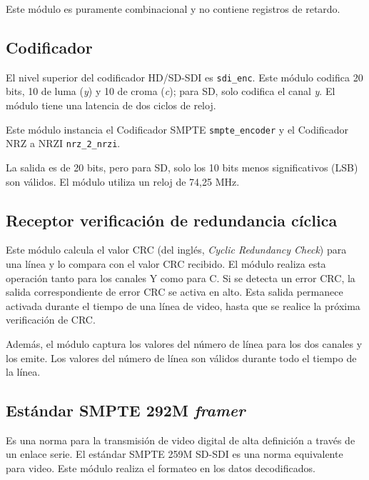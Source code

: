 Este módulo es puramente combinacional y no contiene registros de retardo.

\subsection{Codificador}

  El nivel superior del codificador HD/SD-SDI es \texttt{sdi\_enc}. Este módulo
  codifica 20 bits, 10 de luma (\textit{y}) y 10 de croma (\textit{c}); para SD,
  solo codifica el canal \textit{y}. El módulo tiene una latencia de dos ciclos
  de reloj.

  Este módulo instancia el Codificador SMPTE \texttt{smpte\_encoder} y el
  Codificador NRZ a NRZI \texttt{nrz\_2\_nrzi}.

  La salida es de 20 bits, pero para SD, solo los 10 bits menos significativos
  (LSB) son válidos. El módulo utiliza un reloj de 74,25 MHz.

\subsection{Receptor verificación de redundancia cíclica}

  Este módulo calcula el valor CRC (del inglés, \textit{Cyclic Redundancy Check}) para una línea y lo compara con el valor CRC
  recibido. El módulo realiza esta operación tanto para los canales Y como para C.
  Si se detecta un error CRC, la salida correspondiente de error CRC se activa en
  alto. Esta salida permanece activada durante el tiempo de una línea de video,
  hasta que se realice la próxima verificación de CRC\@.

  Además, el módulo captura los valores del número de línea para los dos canales
  y los emite. Los valores del número de línea son válidos durante todo el tiempo
  de la línea.

\subsection{Estándar SMPTE 292M \textit{framer}}

Es una norma para la transmisión de video digital de alta definición a través
de un enlace serie. El estándar SMPTE 259M SD-SDI es una norma equivalente
para video. Este módulo realiza el formateo en los datos decodificados.

